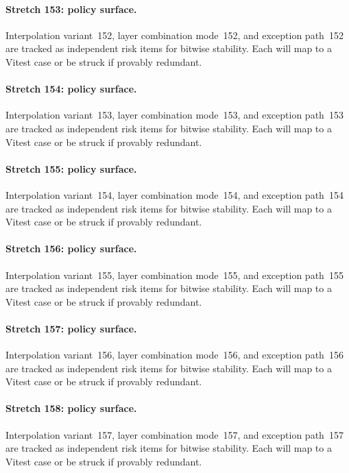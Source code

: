 \documentclass[sigconf,nonacm]{acmart}
\begin{document}
\paragraph{Stretch 153: policy surface.}
Interpolation variant~152, layer combination mode~152, and exception path~152 are tracked as independent risk items for bitwise stability. Each will map to a Vitest case or be struck if provably redundant. %

\paragraph{Stretch 154: policy surface.}
Interpolation variant~153, layer combination mode~153, and exception path~153 are tracked as independent risk items for bitwise stability. Each will map to a Vitest case or be struck if provably redundant. %

\paragraph{Stretch 155: policy surface.}
Interpolation variant~154, layer combination mode~154, and exception path~154 are tracked as independent risk items for bitwise stability. Each will map to a Vitest case or be struck if provably redundant. %

\paragraph{Stretch 156: policy surface.}
Interpolation variant~155, layer combination mode~155, and exception path~155 are tracked as independent risk items for bitwise stability. Each will map to a Vitest case or be struck if provably redundant. %

\paragraph{Stretch 157: policy surface.}
Interpolation variant~156, layer combination mode~156, and exception path~156 are tracked as independent risk items for bitwise stability. Each will map to a Vitest case or be struck if provably redundant. %

\paragraph{Stretch 158: policy surface.}
Interpolation variant~157, layer combination mode~157, and exception path~157 are tracked as independent risk items for bitwise stability. Each will map to a Vitest case or be struck if provably redundant. %
\end{document}

